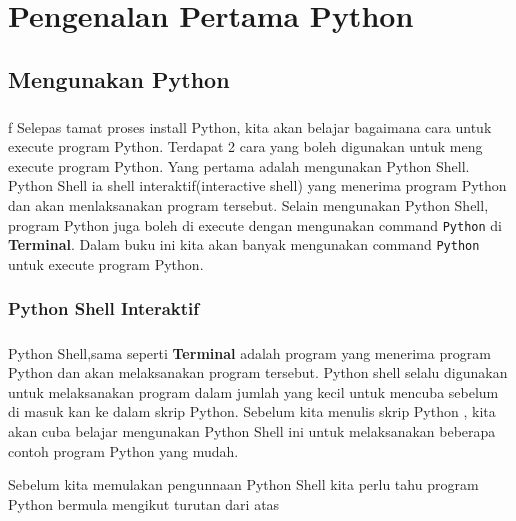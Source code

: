 \chapter{Pengenalan Pertama Python}

\section{Mengunakan Python}

\paragraph{}f
	Selepas tamat proses install Python, kita akan belajar bagaimana cara untuk execute program Python. Terdapat 2 cara yang boleh digunakan untuk meng execute program Python. Yang pertama adalah mengunakan Python Shell. Python Shell ia  shell interaktif(interactive shell) yang menerima program Python dan akan menlaksanakan program tersebut. Selain mengunakan Python Shell, program Python juga boleh di execute dengan mengunakan command \lstinline!Python! di \textbf{Terminal}. Dalam buku ini kita akan banyak mengunakan command \lstinline!Python! untuk execute program Python.  

\subsection{Python Shell Interaktif}

\paragraph{}
	Python Shell,sama seperti \textbf{Terminal} adalah program yang menerima program Python dan akan melaksanakan program tersebut. 
Python shell selalu digunakan untuk melaksanakan program dalam jumlah yang kecil untuk mencuba sebelum di masuk kan ke dalam skrip Python. 
 Sebelum kita menulis skrip Python , kita akan cuba belajar mengunakan Python Shell ini untuk melaksanakan beberapa contoh program Python yang mudah.


Sebelum kita memulakan pengunnaan Python Shell kita perlu tahu program Python bermula mengikut turutan dari atas 
